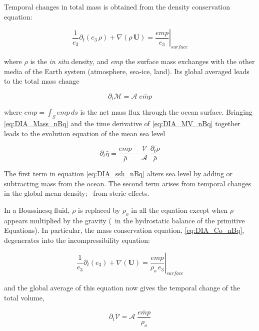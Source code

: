 \documentclass[../main/NEMO_manual]{subfiles}
\begin{document}
Temporal changes in total mass is obtained from the density conservation equation:

\begin{equation}
  \frac{1}{e_3} \partial_t ( e_3\,\rho) + \nabla( \rho \, \textbf{U} )
  = \left. \frac{\textit{emp}}{e_3}\right|_\textit{surface}
  \label{eq:DIA_Co_nBq}
\end{equation}

where $\rho$ is the \textit{in situ} density, and \textit{emp} the surface mass exchanges with the other media of
the Earth system (atmosphere, sea-ice, land).
Its global averaged leads to the total mass change

\begin{equation}
  \partial_t \mathcal{M} = \mathcal{A} \;\overline{\textit{emp}}
  \label{eq:DIA_Mass_nBq}
\end{equation}

where $\overline{\textit{emp}} = \int_S \textit{emp}\,ds$ is the net mass flux through the ocean surface.
Bringing \autoref{eq:DIA_Mass_nBq} and the time derivative of \autoref{eq:DIA_MV_nBq} together leads to
the evolution equation of the mean sea level

\begin{equation}
  \partial_t \bar{\eta} = \frac{\overline{\textit{emp}}}{ \bar{\rho}}
  - \frac{\mathcal{V}}{\mathcal{A}} \;\frac{\partial_t \bar{\rho} }{\bar{\rho}}
  \label{eq:DIA_ssh_nBq}
\end{equation}

The first term in equation \autoref{eq:DIA_ssh_nBq} alters sea level by adding or subtracting mass from the ocean.
The second term arises from temporal changes in the global mean density; \ie\ from steric effects.

In a Boussinesq fluid, $\rho$ is replaced by $\rho_o$ in all the equation except when $\rho$ appears multiplied by
the gravity (\ie\ in the hydrostatic balance of the primitive Equations).
In particular, the mass conservation equation, \autoref{eq:DIA_Co_nBq}, degenerates into the incompressibility equation:

\[
  \frac{1}{e_3} \partial_t ( e_3 ) + \nabla( \textbf{U} ) = \left. \frac{\textit{emp}}{\rho_o \,e_3}\right|_ \textit{surface}
\]

and the global average of this equation now gives the temporal change of the total volume,

\[
  \partial_t \mathcal{V} = \mathcal{A} \;\frac{\overline{\textit{emp}}}{\rho_o}
\]
\end{document}
